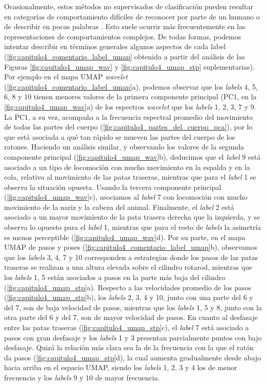 Ocasionalmente, estos métodos no supervisados de clasificación pueden resultar en categorías de comportamiento difíciles de reconocer por parte de un humano o de describir en pocas palabras \cite{datta_computational_neuroethology, berman_mapping}. Esto suele ocurrir más frecuentemente en las representaciones de comportamientos complejos. De todas formas, podemos intentar describir en términos generales algunos aspectos de cada label (\autoref{fig:capitulo4_comentario_label_umap} obtenida a partir del análisis de las Figuras \ref{fig:capitulo4_umap_wav} y \ref{fig:capitulo4_umap_stp} suplementarias). Por ejemplo en el mapa UMAP \textit{wavelet} (\autoref{fig:capitulo4_comentario_label_umap}a), podemos observar que los \textit{labels} 4, 5, 6, 8 y 10 tienen menores valores de la primera componente principal (PC1, en la \autoref{fig:capitulo4_umap_wav}a) de los espectros \textit{wavelet} que los \textit{labels} 1, 2, 3, 7 y 9. La PC1, a su vez, acompaña a la frecuencia espectral promedio del movimiento de todas las partes del cuerpo (\autoref{fig:capitulo4_partes_del_cuerpo_pca}), por lo que está asociada a qué tan rápido se mueven las partes del cuerpo de los ratones. Haciendo un análisis similar, y observando los valores de la segunda componente principal (\autoref{fig:capitulo4_umap_wav}b), deducimos que el \textit{label} 9 está asociado a un tipo de locomoción con mucho movimiento en la espalda y en la cola, relativo al movimiento de las patas traseras, mientras que para el \textit{label} 1 se observa la situación opuesta. Usando la tercera componente principal (\autoref{fig:capitulo4_umap_wav}c), asociamos al \textit{label} 7 con locomoción con mucho movimiento de la nariz y la cabeza del animal. Finalmente, el \textit{label} 2 está asociado a un mayor movimiento de la pata trasera derecha que la izquierda, y se observa lo opuesto para el \textit{label} 1, mientras que para el resto de \textit{labels} la asimetría es menos perceptible (\autoref{fig:capitulo4_umap_wav}d).
Por su parte, en el mapa UMAP de pasos y poses (\autoref{fig:capitulo4_comentario_label_umap}b), observamos que los \textit{labels} 3, 4, 7 y 10 corresponden a estrategias donde los pasos de las patas traseras se realizan a una altura elevada sobre el cilindro rotarod, mientras que los \textit{labels} 1, 5 están asociados a pasos en la parte más baja del cilindro (\autoref{fig:capitulo4_umap_stp}a). Respecto a las velocidades promedio de los pasos (\autoref{fig:capitulo4_umap_stp}b), los \textit{labels} 2, 3, 4 y 10, junto con una parte del 6 y del 7, son de baja velocidad de pasos, mientras que los \textit{labels} 1, 5 y 8, junto con la otra parte del 6 y del 7, son de mayor velocidad de pasos. En cuanto al desfasaje entre las patas traseras (\autoref{fig:capitulo4_umap_stp}c), el \textit{label} 7 está asociado a pasos con gran desfasaje y los \textit{labels} 1 y 3 presentan parcialmente puntos con bajo desfasaje. Quizá la relación más clara sea la de la frecuencia con la que el ratón da pasos (\autoref{fig:capitulo4_umap_stp}d), la cual aumenta gradualmente desde abajo hacia arriba en el espacio UMAP, siendo los \textit{labels} 1, 2, 3 y 4 los de menor frecuencia y los \textit{labels} 9 y 10 de mayor frecuencia.

